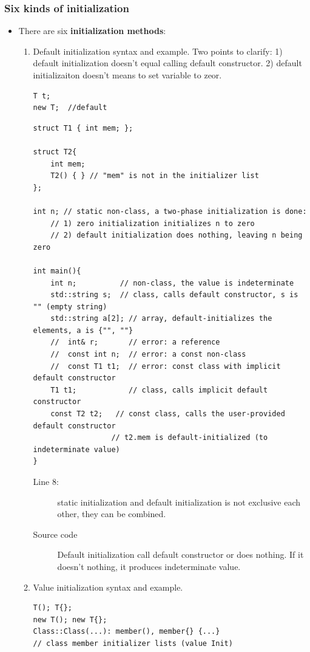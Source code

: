 \documentclass[a4paper,11pt,twoside]{book}
\begin{document}
\subsubsection{Six kinds of initialization}
\begin{itemize}
	\item There are six \textbf{initialization methods}:
	\begin{enumerate}
		\item Default initialization syntax and example. Two points to clarify: 1) default initialization doesn't equal calling default constructor. 2) default initializaiton doesn't means to set variable to zeor.
\begin{lstlisting}[numbers=none]
T t;
new T;  //default
\end{lstlisting}

	
\begin{lstlisting}
struct T1 { int mem; };

struct T2{
	int mem;
	T2() { } // "mem" is not in the initializer list
};

int n; // static non-class, a two-phase initialization is done:
	// 1) zero initialization initializes n to zero
	// 2) default initialization does nothing, leaving n being zero

int main(){
	int n;          // non-class, the value is indeterminate
	std::string s;  // class, calls default constructor, s is "" (empty string)
	std::string a[2]; // array, default-initializes the elements, a is {"", ""}
	//  int& r;       // error: a reference
	//  const int n;  // error: a const non-class
	//  const T1 t1;  // error: const class with implicit default constructor
	T1 t1;            // class, calls implicit default constructor
	const T2 t2;   // const class, calls the user-provided default constructor
                  // t2.mem is default-initialized (to indeterminate value)
}
\end{lstlisting}

\begin{description}
	\item[Line 8:] static initialization and default initialization is not exclusive each other, they can be combined. 
	\item[Source code] Default initialization call default constructor or does nothing. If it doesn't nothing, it produces indeterminate value.
\end{description}


		\item Value initialization syntax and example.
\begin{lstlisting}[numbers=none]
T(); T{};
new T(); new T{};
Class::Class(...): member(), member{} {...} 
// class member initializer lists (value Init)
\end{lstlisting}



\end{enumerate}
\end{itemize}
\end{document}
